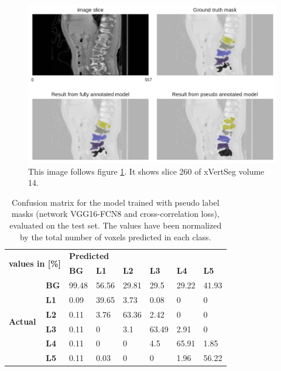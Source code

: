 \begin{figure}
    \centering
        \includegraphics[width=.90\textwidth]{images/fullvsPseudo_xVertSeg_014_260.pdf}
    \caption{This image follows figure \ref{fig:fullvsPseudo}. It shows slice 260 of xVertSeg volume 14. 
    \protect
    \label{fig:fullvsPseudo}}
\end{figure}

\begin{table}
 

\begin{tabular}{ll|llllll}
    \toprule
    \multicolumn{2}{l|}{\multirow{2}{*}{\textbf{values in {[}\%{]}}}} & \multicolumn{6}{l}{\textbf{Predicted}}                                            \\
    \multicolumn{2}{l|}{}                                             & \textbf{BG} & \textbf{L1} & \textbf{L2} & \textbf{L3} & \textbf{L4} & \textbf{L5} \\ \hline
    \multirow{6}{*}{\textbf{Actual}}           & \textbf{BG}          & 99.48       & 56.56       & 29.81       & 29.5        & 29.22       & 41.93       \\
     & \textbf{L1} & 0.09 & 39.65 & 3.73  & 0.08  & 0     & 0     \\
     & \textbf{L2} & 0.11 & 3.76  & 63.36 & 2.42  & 0     & 0     \\
     & \textbf{L3} & 0.11 & 0     & 3.1   & 63.49 & 2.91  & 0     \\
     & \textbf{L4} & 0.11 & 0     & 0     & 4.5   & 65.91 & 1.85  \\
     & \textbf{L5} & 0.11 & 0.03  & 0     & 0     & 1.96  & 56.22 \\ \bottomrule
    \end{tabular}

    \caption{Confusion matrix for the model trained with pseudo label masks (network VGG16-FCN8 and cross-correlation loss), evaluated on the test set.
    The values have been normalized by the total number of voxels predicted in each class.
    \label{tab:pseudo_confusionMatrix}
    }
\end{table}

